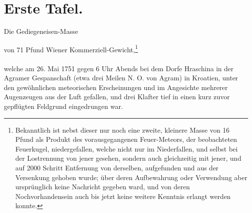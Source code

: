\documentclass[a4paper, 11pt, oneside, german]{article}
\begin{document}
\section{Erste Tafel.}
\begin{center}
Die Gediegeneisen-Masse

von 71 Pfund Wiener Kommerziell-Gewicht,\footnote{Bekanntlich ist nebst dieser nur noch eine zweite, kleinere Masse von 16 Pfund als Produkt des vorausgegangenen Feuer-Meteors, der beobachteten Feuerkugel, niedergefallen, welche nicht nur im Niederfallen, und selbst bei der Lostrennung von jener gesehen, sondern auch gleichzeitig mit jener, und auf 2000 Schritt Entfernung von derselben, aufgefunden und aus der Versenkung gehoben wurde; über deren Aufbewahrung oder Verwendung aber ursprünglich keine Nachricht gegeben ward, und von deren Nochvorhandensein auch bis jetzt keine weitere Kenntnis erlangt werden konnte.}
\end{center}
\paragraph{}
welche am 26. Mai 1751 gegen 6 Uhr Abends bei dem Dorfe Hraschina in der Agramer Gespanschaft (etwa drei Meilen N. O. von Agram) in Kroatien, unter den gewöhnlichen meteorischen Erscheinungen und im Angesichte mehrerer Augenzeugen aus der Luft gefallen, und drei Klafter tief in einen kurz zuvor gepflügten Feldgrund eingedrungen war.
\end{document}
